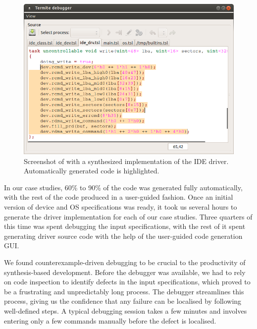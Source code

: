 \begin{figure}
    \center
    \includegraphics[width=\linewidth]{imgs/screenshot_write.png}
    \caption{Screenshot of \termite with a synthesized implementation of the IDE driver.  Automatically generated code is highlighted.}
    \label{f:screenshot_write}
\end{figure}

In our case studies, 60\% to 90\% of the code was generated fully automatically, with the rest of the code produced in a user-guided fashion.  Once an initial version of device and OS specifications was ready, it took us several hours to generate the driver implementation for each of our case studies.  Three quarters of this time was spent debugging the input specifications, with the rest of it spent generating driver source code with the help of the user-guided code generation GUI.

We found counterexample-driven debugging to be crucial to the productivity of synthesis-based development.  Before the debugger was available, we had to rely on code inspection to identify defects in the input specifications, which proved to be a frustrating and unpredictably long process.  The \termite debugger streamlines this process, giving us the confidence that any failure can be localised by following well-defined steps.  A typical debugging session takes a few minutes and involves entering only a few commands manually before the defect is localised. 

%
%
%

